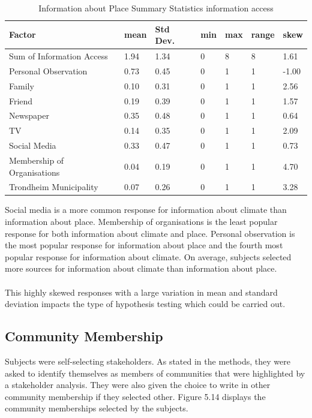 \begin{center}
\begin{table}[H]
    \centering
    \begin{tabular}{|l|l|l|l|l|l|l|}
    \hline
         \textbf{Factor} & \textbf{mean} & \textbf{Std Dev.} & \textbf{min} & \textbf{max} & \textbf{range} & \textbf{skew}  \\ \hline
        Sum of Information Access & 1.94 & 1.34 & 0 & 8 & 8 & 1.61 \\ \hline
        Personal Observation & 0.73 & 0.45 & 0 & 1 & 1 & -1.00  \\ \hline
        Family & 0.10 & 0.31 & 0 & 1 & 1 & 2.56 \\ \hline
        Friend & 0.19 & 0.39 & 0 & 1 & 1 & 1.57  \\ \hline
        Newspaper & 0.35 & 0.48 & 0 & 1 & 1 & 0.64  \\ \hline
        TV & 0.14 & 0.35 & 0 & 1 & 1 & 2.09 \\ \hline
       Social Media & 0.33 & 0.47 & 0 & 1 & 1 & 0.73  \\ \hline
        Membership of Organisations & 0.04 & 0.19 & 0 & 1 & 1 & 4.70 \\ \hline
        Trondheim Municipality & 0.07 & 0.26 & 0 & 1 & 1 & 3.28\\ \hline
                
         \end{tabular}
    \caption{Information about Place Summary Statistics information access}
\label{table:summary_stats_info_access}
\end{table}
\end{center}

 Social media is a more common response for information about climate than information about place. Membership of organisations is the least popular response for both information about climate and place. Personal observation is the most popular response for information about place and the fourth most popular response for information about climate. On average, subjects selected more sources for information about climate than information about place. 
\paragraph{}
This highly skewed responses with a large variation in mean and standard deviation impacts the type of hypothesis testing which could be carried out.

\subsection{Community Membership}
Subjects were self-selecting stakeholders.  As stated in the methods, they were asked to identify themselves as members of communities that were highlighted by a stakeholder analysis. They were also given the choice to write in other community membership if they selected other. Figure 5.14 displays the community memberships selected by the subjects. 


